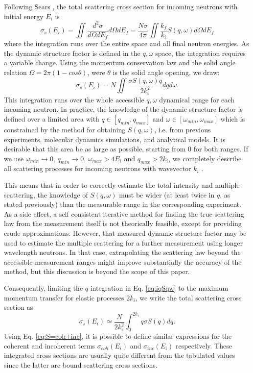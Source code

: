 Following Sears \cite{Sears75}, the total scattering cross section for incoming neutrons with initial energy $E_i$ is
\begin{equation}
\label{eq:iisigma}
\sigma_s(E_i) = \iint \frac{d^2 \sigma}{d\Omega dE_f} d\Omega dE_f = \frac{N \sigma}{4\pi} \iint \frac{k_f}{k_i} S(q, \omega) d\Omega dE_f
\end{equation}
where the integration runs over the entire space and all final neutron energies.
As the dynamic structure factor is defined in the $q,\omega$ space, the integration requires a variable change. Using the momentum conservation law and the solid angle relation $\Omega=2\pi(1-cos \theta)$, were $\theta$ is the solid angle opening, we draw:
\begin{equation}
\label{eq:iqSqw}
\sigma_s(E_i) = N \iint \frac{\sigma S(q,\omega) q}{2 k_i^2} dq d\omega.
\end{equation}
This integration runs over the whole accessible $q,\omega$ dynamical range for each incoming neutron.
In practice, the knowledge of the dynamic structure factor is defined over a limited area with $q \in [q_{min}, q_{max}]$ and $\omega \in [\omega_{min}, \omega_{max}]$ which is constrained by the method for obtaining $S(q,\omega)$, i.e. from previous experiments, molecular dynamics simulations, and analytical models. It is desirable that this area be as large as possible, starting from 0 for both ranges. If we use $\omega_{min} \rightarrow 0$, $q_{min} \rightarrow 0$, $\omega_{max} > 4E_i$ and $q_{max} > 2k_i$, we completely describe all scattering processes for incoming neutrons with wavevector $k_i$ \cite{msc}.

This means that in order to correctly estimate the total intensity and multiple scattering, the knowledge of $S(q,\omega)$ must be wider (at least twice in $q$, as stated previously) than the measurable range in the corresponding experiment.
As a side effect, a self consistent iterative method for finding the true scattering law from the measurement itself is not theorically feasible, except for providing crude approximations.
However, that measured dynamic structure factor may be used to estimate the multiple scattering for a further measurement using longer wavelength neutrons.
In that case, extrapolating the scattering law beyond the accessible measurement ranges might improve substantially the accuracy of the method, but this discussion is beyond the scope of this paper.

Consequently, limiting the $q$ integration in Eq. \ref{eq:iqSqw} to the maximum momentum transfer for elastic processes $2 k_i$, we write the total scattering cross section as
\begin{equation}
\label{eq:iqSq}
\sigma_s(E_i) \simeq \frac{N}{2 k_i^2} \int_0^{2k_i} q \sigma S(q) dq.
\end{equation}
Using Eq. \ref{eq:S=coh+inc}, it is possible to define similar expressions for the coherent and incoherent terms $\sigma_{coh}(E_i)$ and $\sigma_{inc}(E_i)$ respectively. These integrated cross sections are usually quite different from the tabulated values \cite{ILLblue} since the latter are bound scattering cross sections.

